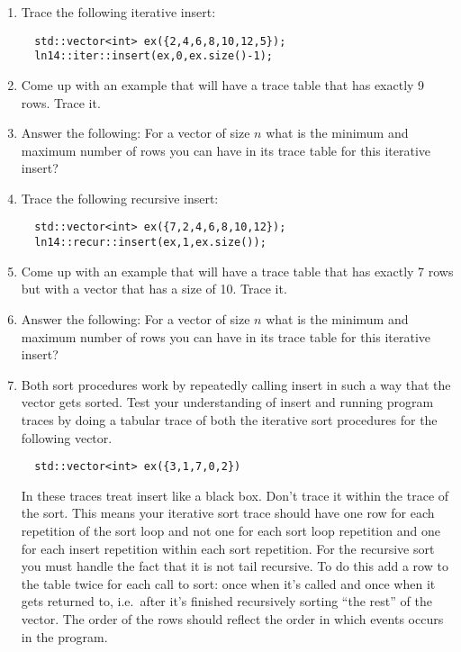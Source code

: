 \documentclass[nobib]{tufte-handout}
\begin{document}
\begin{enumerate}
  \item Trace the following iterative insert:
  \begin{lstlisting}
  std::vector<int> ex({2,4,6,8,10,12,5});
  ln14::iter::insert(ex,0,ex.size()-1);
  \end{lstlisting}

  \item Come up with an example that will have a trace table that has exactly 9 rows. Trace it.

  \item Answer the following: For a vector of size \(n\) what is the minimum and maximum number of rows you can have in its trace table for this iterative insert?

  \item Trace the following recursive insert:
  \begin{lstlisting}
  std::vector<int> ex({7,2,4,6,8,10,12});
  ln14::recur::insert(ex,1,ex.size());
  \end{lstlisting}

  \item Come up with an example that will have a trace table that has exactly 7 rows but with a vector that has a size of 10. Trace it.

  \item Answer the following: For a vector of size \(n\) what is the minimum and maximum number of rows you can have in its trace table for this iterative insert?

  \item Both sort procedures work by repeatedly calling insert in such a way that the vector gets sorted. Test your understanding of insert and running program traces by doing a tabular trace of both the iterative sort procedures for the following vector.

  \begin{lstlisting}
  std::vector<int> ex({3,1,7,0,2})
  \end{lstlisting}

  In these traces treat insert like a black box. Don't trace it within the trace of the sort. This means your iterative sort trace should have one row for each repetition of the sort loop and not one for each sort loop repetition and one for each insert repetition within each sort repetition. For the recursive sort you must handle the fact that it is not tail recursive. To do this add a row to the table twice for each call to sort: once when it's called and once when it gets returned to, i.e.\ after it's finished recursively sorting ``the rest'' of the vector. The order of the rows should reflect the order in which events occurs in the program.

\end{enumerate}
\end{document}
